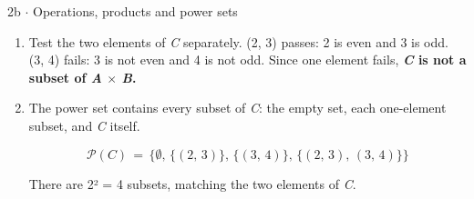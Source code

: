 \documentclass[11pt]{article}
\begin{document}
\begin{keepsection}
\begin{workedbox}{2b \ensuremath{\cdot} Operations, products and power sets}
\begin{enumerate}
\begin{equation*}{A}\, \times \, {B}\, =\, \{({a},\, {b})\, :\, {a}\, \in \, {A},\, {b}\, \in \, {B}\}\end{equation*}
\item Test the two elements of \textit{C} separately. (2, 3) passes: 2 is even and 3 is odd. (3, 4) fails: 3 is not even and 4 is not odd. Since one element fails, \textbf{\textit{C} is not a subset of \textit{A} \ensuremath{\times} \textit{B}.}
\item {}
The power set contains every subset of \textit{C}: the empty set, each one-element subset, and \textit{C} itself.

\begin{equation*}\mathcal{P}({C})\, =\, \{\emptyset ,\, \{(2,\, 3)\},\, \{(3,\, 4)\},\, \{(2,\, 3),\, (3,\, 4)\}\}\end{equation*}

There are 2² = 4 subsets, matching the two elements of \textit{C}.
\end{enumerate}
\end{workedbox}

\end{keepsection}
\end{document}
